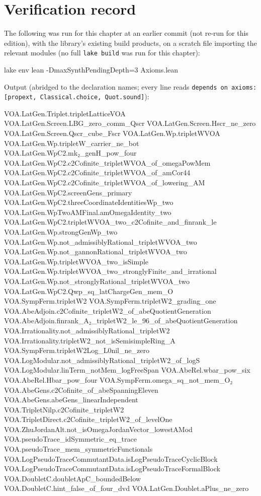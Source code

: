 \section{Verification record}\label{l18:sec:verification}

The following was run for this chapter at an earlier commit (not re-run for this edition), with the library's existing build products, on a
scratch file importing the relevant modules (no full \texttt{lake build} was run for this chapter):
\begin{plaincode}
lake env lean -DmaxSynthPendingDepth=3 Axioms.lean
\end{plaincode}
Output (abridged to the declaration names; every line reads
\texttt{depends on axioms: [propext, Classical.choice, Quot.sound]}):
\begin{plaincode}
VOA.LatGen.Triplet.tripletLatticeVOA
VOA.LatGen.Screen.LBG_zero_comm_Qscr          VOA.LatGen.Screen.Hscr_ne_zero
VOA.LatGen.Screen.Qscr_cube_Fscr              VOA.LatGen.Wp.tripletWVOA
VOA.LatGen.Wp.tripletW_carrier_ne_bot         VOA.LatGen.WpC2.mk₂_genH_pow_four
VOA.LatGen.WpC2.c2Cofinite_tripletWVOA_of_omegaPowMem
VOA.LatGen.WpC2.c2Cofinite_tripletWVOA_of_amCor44
VOA.LatGen.WpC2.c2Cofinite_tripletWVOA_of_lowering_AM
VOA.LatGen.WpC2.screenGens_primary            VOA.LatGen.WpC2.threeCoordinateIdentitiesWp_two
VOA.LatGen.WpTwoAMFinal.amOmegaIdentity_two
VOA.LatGen.WpC2.tripletWVOA_two_c2Cofinite_and_finrank_le
VOA.LatGen.Wp.strongGenWp_two
VOA.LatGen.Wp.not_admissiblyRational_tripletWVOA_two
VOA.LatGen.Wp.not_gannonRational_tripletWVOA_two
VOA.LatGen.Wp.tripletWVOA_two_isSimple
VOA.LatGen.Wp.tripletWVOA_two_stronglyFinite_and_irrational
VOA.LatGen.Wp.not_stronglyRational_tripletWVOA_two
VOA.LatGen.WpC2.Qwp_sq_latChargeGen_mem_O
VOA.SympFerm.tripletW2                         VOA.SympFerm.tripletW2_grading_one
VOA.AbeAdjoin.c2Cofinite_tripletW2_of_abeQuotientGeneration
VOA.AbeAdjoin.finrank_A₂_tripletW2_le_96_of_abeQuotientGeneration
VOA.Irrationality.not_admissiblyRational_tripletW2
VOA.Irrationality.tripletW2_not_isSemisimpleRing_A
VOA.SympFerm.tripletW2Log_L0nil_ne_zero
VOA.LogModular.not_admissiblyRational_tripletW2_of_logS
VOA.LogModular.linTerm_notMem_logFreeSpan
VOA.AbeRel.wbar_pow_six                         VOA.AbeRel.Hbar_pow_four
VOA.SympFerm.omega_sq_not_mem_O₂               VOA.AbeGens.c2Cofinite_of_abeSpanningEleven
VOA.AbeGens.abeGens_linearIndependent          VOA.TripletNilp.c2Cofinite_tripletW2
VOA.TripletDirect.c2Cofinite_tripletW2_of_levelOne
VOA.ZhuJordanAlt.not_isOmegaJordanVector_lowestAMod
VOA.pseudoTrace_idSymmetric_eq_trace           VOA.pseudoTrace_mem_symmetricFunctionals
VOA.LogPseudoTraceCommutantData.isLogPseudoTraceCyclicBlock
VOA.LogPseudoTraceCommutantData.isLogPseudoTraceFormalBlock
VOA.DoubletC.doubletApC_boundedBelow           VOA.DoubletC.hint_false_of_four_dvd
VOA.LatGen.Doublet.aPlus_ne_zero
\end{plaincode}
